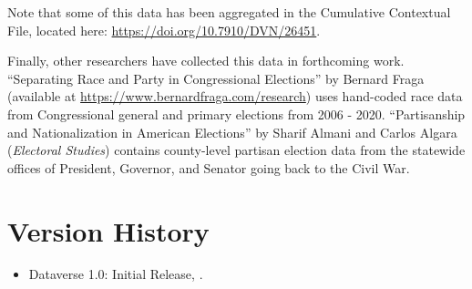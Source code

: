 \documentclass[12pt]{article}
\begin{document}
Note that some of this data has been aggregated in the Cumulative Contextual File, located here: \url{https://doi.org/10.7910/DVN/26451}.




Finally, other researchers have collected this data in forthcoming work. ``Separating Race and Party in Congressional
Elections'' by Bernard Fraga (available at \url{https://www.bernardfraga.com/research}) uses hand-coded race data from Congressional general and primary elections from 2006 - 2020. ``Partisanship and Nationalization in American Elections'' by Sharif Almani and Carlos Algara (\emph{Electoral Studies}) contains county-level partisan election data from the statewide offices of President, Governor, and Senator going back to the Civil War. 


\section{Version History}

\begin{itemize}
\item Dataverse 1.0: Initial Release, .
\end{itemize}	
	
\end{document}
